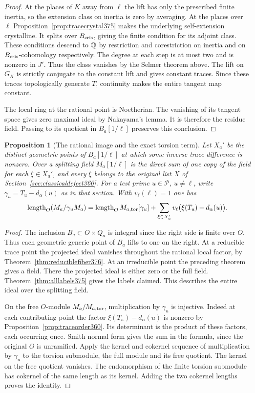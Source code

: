 \documentclass[a4paper,11pt]{article}
\newtheorem{proposition}{Proposition}[section]
\theoremstyle{definition}
\theoremstyle{remark}
\newcommand{\len}{\operatorname{length}}\newcommand{\Res}{\operatorname*{Res}}
\numberwithin{equation}{section}
\begin{document}
\begin{proof}
At the places of \(K\) away from \(\ell\) the lift has only
the prescribed finite inertia, so the extension class on
inertia is zero by averaging. At the places over \(\ell\)
Proposition~\ref{prop:tracecrystal375} makes the underlying
self-extension crystalline. It splits over \(B_{\rm cris}\),
giving the finite condition for its adjoint class. These
conditions descend to \(\mathbb Q\) by restriction and
corestriction on inertia and on \(B_{\rm cris}\)-cohomology
respectively. The degree at each step is at most two and
is nonzero in \(J'\). Thus the class vanishes by the
Selmer theorem above. The lift on \(G_K\) is strictly
conjugate to the constant lift and gives constant traces.
Since these traces topologically generate \(T\), continuity
makes the entire tangent map constant.

The local ring at the rational point is Noetherian. The
vanishing of its tangent space gives zero maximal ideal
by Nakayama's lemma. It is therefore the residue field.
Passing to its quotient in \(B_a[1/\ell]\) preserves this
conclusion.
\end{proof}

\begin{proposition}[The rational image and the exact torsion term]
\label{prop:torsionterm377}
Let \(X_a'\) be the distinct geometric points of
\(B_a[1/\ell]\) at which some inverse-trace difference is
nonzero. Over a splitting field \(M_a[1/\ell]\) is the direct
sum of one copy of the field for each \(\xi\in X_a'\), and
every \(\xi\) belongs to the original list \(X\) of
Section~\ref{sec:classicaldefect360}.
For a test prime \(u\in\mathcal P\), \(u\ne\ell\), write
\(\gamma_u=T_u-d_\alpha(u)\) as in that section. With
\(v_\ell(\ell)=1\) one has
\[
 \len_O(M_a/\gamma_u M_a)
  =\len_O M_{a,\rm tor}[\gamma_u]
       +\sum_{\xi\in X_a'}v_\ell\bigl(\xi(T_u)-d_\alpha(u)\bigr).
\]
\end{proposition}
\begin{proof}
The inclusion \(B_a\subset O\times Q_a\) is integral since
the right side is finite over \(O\). Thus each geometric
generic point of \(B_a\) lifts to one on the right. At a
reducible trace point the projected ideal vanishes throughout
the rational local factor, by Theorem~\ref{thm:reduciblefiber376}.
At an irreducible point the preceding theorem gives a field.
There the projected ideal is either zero or the full field.
Theorem~\ref{thm:alllabels375} gives the labels claimed.
This describes the entire ideal over the splitting field.

On the free \(O\)-module \(M_a/M_{a,\rm tor}\), multiplication
by \(\gamma_u\) is injective. Indeed at each contributing
point the factor \(\xi(T_u)-d_\alpha(u)\) is nonzero by
Proposition~\ref{prop:traceorder360}. Its determinant is
the product of these factors, each occurring once. Smith
normal form gives the sum in the formula, since the original
\(O\) is unramified. Apply the kernel and cokernel sequence
of multiplication by \(\gamma_u\) to the torsion submodule,
the full module and its free quotient. The kernel on the
free quotient vanishes. The endomorphism of the finite
torsion submodule has cokernel of the same length as its
kernel. Adding the two cokernel lengths proves the identity.
\end{proof}
\end{document}
